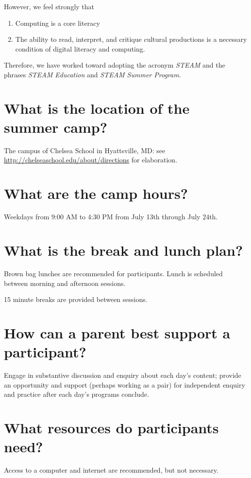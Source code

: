\documentclass[letterpaper,10pt,english]{sphinxmanual}
\begin{document}
However, we feel strongly that
\begin{enumerate}
\item {} 
Computing is a core literacy

\item {} 
The ability to read, interpret, and critique cultural productions is a necessary condition of digital literacy and computing.

\end{enumerate}

Therefore, we have worked toward adopting the acronym \emph{STEAM} and the phrases \emph{STEAM Education} and \emph{STEAM Summer Program}.


\section{What is the location of the summer camp?}
\label{faq:what-is-the-location-of-the-summer-camp}
The campus of Chelsea School in Hyattsville, MD: see \href{http://chelseaschool.edu/about/directions}{http://chelseaschool.edu/about/directions} for elaboration.


\section{What are the camp hours?}
\label{faq:what-are-the-camp-hours}
Weekdays from 9:00 AM to 4:30 PM from July 13th through July 24th.


\section{What is the break and lunch plan?}
\label{faq:what-is-the-break-and-lunch-plan}
Brown bag lunches are recommended for participants. Lunch is scheduled between morning and afternoon sessions.

15 minute breaks are provided between sessions.


\section{How can a parent best support a participant?}
\label{faq:how-can-a-parent-best-support-a-participant}
Engage in substantive discussion and enquiry about each day's content; provide an opportunity and support (perhaps working as a pair) for independent enquiry and practice after each day's programs conclude.


\section{What resources do participants need?}
\label{faq:what-resources-do-participants-need}
Access to a computer and internet are recommended, but not necessary.
\end{document}
